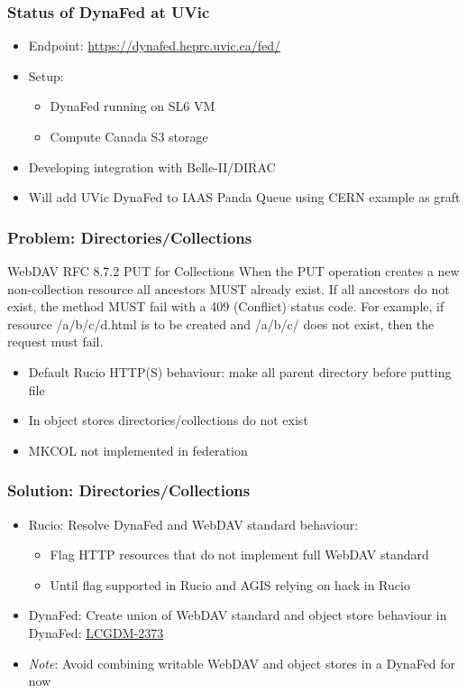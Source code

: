 \documentclass{beamer}
\begin{document}
\begin{frame}
  \frametitle{Status of DynaFed at UVic}
  \begin{itemize}
    \item Endpoint: \url{https://dynafed.heprc.uvic.ca/fed/}
    \item Setup:
    \begin{itemize}
      \item DynaFed running on SL6 VM
      \item Compute Canada S3 storage
    \end{itemize}
		\item Developing integration with Belle-II/DIRAC
    \item Will add UVic DynaFed to IAAS Panda Queue using CERN example as graft
  \end{itemize}
\end{frame}

\begin{frame}
  \frametitle{Problem: Directories/Collections}
  \begin{block}{WebDAV RFC 8.7.2 PUT for Collections}
    When the PUT operation creates a new non-collection resource all ancestors MUST already exist. If all ancestors do not exist, the method MUST fail with a 409 (Conflict) status code. For example, if resource /a/b/c/d.html is to be created and /a/b/c/ does not exist, then the request must fail.
  \end{block}
  \begin{itemize}
    \item<1- > Default Rucio HTTP(S) behaviour: make all parent directory before putting file
    \item<2- > In object stores directories/collections do not exist
    \item<2- > MKCOL not implemented in federation
  \end{itemize}
\end{frame}

\begin{frame}
  \frametitle{Solution: Directories/Collections}
  \begin{itemize}
    \item Rucio: Resolve DynaFed and WebDAV standard behaviour:
    \begin{itemize}
      \item Flag HTTP resources that do not implement full WebDAV standard
      \item Until flag supported in Rucio and AGIS relying on \alert{hack in Rucio}
    \end{itemize}
    \item DynaFed: Create union of WebDAV standard and object store behaviour in DynaFed: \href{https://its.cern.ch/jira/browse/LCGDM-2373}{LCGDM-2373}
    \item \emph{Note}: Avoid combining writable WebDAV and object stores in a DynaFed for now
  \end{itemize}
\end{frame}
\end{document}

